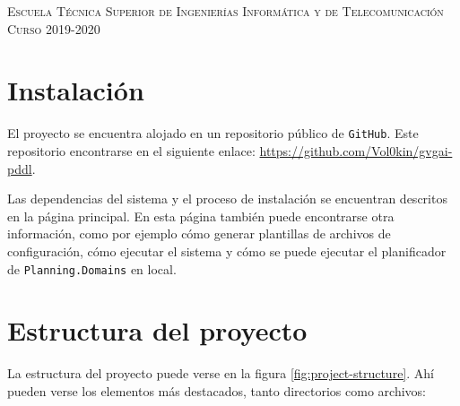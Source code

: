 \documentclass[11pt,a4paper]{article}
\begin{document}
\begin{titlepage}
\begin{minipage}{\textwidth}
\vspace{0.7cm}
\textsc{Escuela Técnica Superior de Ingenierías Informática y de Telecomunicación}\\
\vspace{1cm}
\textsc{Curso 2019-2020}
\end{minipage}
\end{titlepage}

\tableofcontents
\thispagestyle{empty}				%

\newpage

\setlength{\parskip}{1em}

\section{Instalación}

El proyecto se encuentra alojado en un repositorio público de \texttt{GitHub}. Este repositorio
encontrarse en el siguiente enlace: \url{https://github.com/Vol0kin/gvgai-pddl}.

Las dependencias del sistema y el proceso de instalación se encuentran descritos en la página principal.
En esta página también puede encontrarse otra información, como por ejemplo cómo generar plantillas
de archivos de configuración, cómo ejecutar el sistema y cómo se puede ejecutar el planificador de
\texttt{Planning.Domains} en local.

\section{Estructura del proyecto}

La estructura del proyecto puede verse en la figura \ref{fig:project-structure}. Ahí pueden verse los elementos
más destacados, tanto directorios como archivos:
\end{document}
